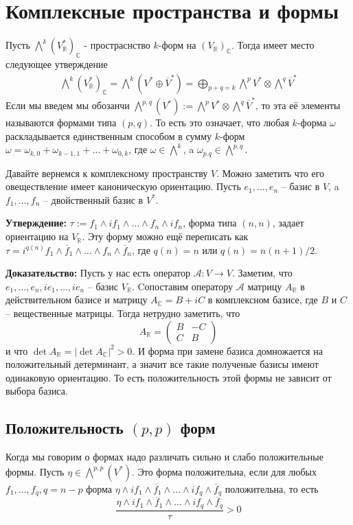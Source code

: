 \documentclass[a4paper, 12pt, oneside]{book}
\begin{document}
\section{Комплексные пространства и формы}
Пусть $\bigwedge^k(V^*_{\mathbb R})_{\mathbb C}$ - простраснство $k$-форм на
$(V_{\mathbb R})_{\mathbb C}$. Тогда имеет место следующее утверждение
\begin{align*}
    \bigwedge^k(V^*_{\mathbb R})_{\mathbb C}=\bigwedge^k(V^*\oplus \overline V^*)=
    \bigoplus_{p+q=k}\bigwedge^p V^*\otimes\bigwedge^q\overline V^*
\end{align*}
Если мы введем мы обозанчи $\bigwedge^{p,q}(V^*):=\bigwedge^p V^*\otimes\bigwedge^q\overline V^*$,
то эта её элементы называются формами типа $(p,q)$. То есть это означает, что любая $k$-форма
$\omega$ раскладывается единственным способом в сумму $k$-форм $\omega =
\omega_{k,0}+\omega_{k-1,1}+\ldots+\omega_{0,k}$, где $\omega\in\bigwedge^k$, a
$\omega_{p.q}\in\bigwedge^{p,q}$.

Давайте вернемся к комплексному пространству $V$. Можно заметить что его
овеществление имеет каноническую ориентацию. Пусть $e_1,\ldots,e_n$ – базис в
$V$, a $f_1,\ldots,f_n$ – двойственный базис в $V^*$.

\textbf{Утверждение:} $\tau:=f_1\wedge if_1\wedge\ldots\wedge f_n\wedge if_n$, форма
типа $(n,n)$, задает ориентацию на $V_{\mathbb R}$. Эту форму можно ещё переписать
как $\tau=i^{q(n)}f_1\wedge\overline f_1\wedge\ldots\wedge f_n\wedge\overline f_n$,
где $q(n)=n$ или $q(n)=n(n+1)/2$.

\textbf{Доказательство:} Пусть у нас есть оператор $\mathcal A: V\rightarrow V$.
Заметим, что $e_1,\ldots,e_n,ie_1,\ldots,ie_n$ – базис $V_{\mathbb R}$. Cопоставим
оператору $\mathcal A$ матрицу $A_{\mathbb R}$ в действительном базисе и матрицу
$A_{\mathbb C}=B+iC$ в комплексном базисе, где $B$ и $C$ – вещественные матрицы.
Тогда нетрудно заметить, что
\[A_{\mathbb R}=\left(\begin{array}{cc}B&-C\\C&B\end{array}\right)\]
и что $\det A_{\mathbb R}=|\det A_{\mathbb C}|^2>0$. И форма при замене базиса
домножается на положительный детерминант, а значит все такие полученые базисы
имеют одинаковую ориентацию. То есть положительность этой формы не зависит от
выбора базиса.

\subsection{Положительность $(p,p)$ форм}
Когда мы говорим о формах надо различать сильно и слабо положительные формы.
Пусть $\eta\in\bigwedge^{p,p}(V^*)$. Это форма положительна, если для любых
$f_1,\ldots,f_q,q=n-p$ форма $\eta\wedge if_1\wedge\overline f_1\wedge\ldots
\wedge if_q\wedge\overline f_q$ положительна, то есть
\[\frac{\eta\wedge if_1\wedge\overline f_1\wedge\ldots\wedge if_q\wedge\overline f_q}{\tau}>0\]
\end{document}
